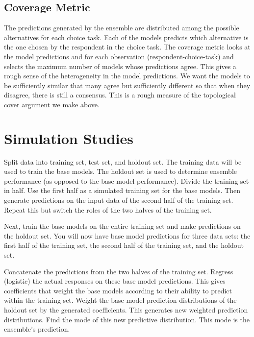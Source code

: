 \documentclass[12pt,titlepage]{mktg-article}
\begin{document}
\hypertarget{coverage-metric}{%
\subsection{Coverage Metric}\label{coverage-metric}}

The predictions generated by the ensemble are distributed among the possible alternatives for each choice task. Each of the models predicts which alternative is the one chosen by the respondent in the choice task. The coverage metric looks at the model predictions and for each observation (respondent-choice-task) and selects the maximum number of models whose predictions agree. This gives a rough sense of the heterogeneity in the model predictions. We want the models to be sufficiently similar that many agree but sufficiently different so that when they disagree, there is still a consensus. This is a rough measure of the topological cover argument we make above.

\hypertarget{simulation-studies}{%
\section{Simulation Studies}\label{simulation-studies}}

Split data into training set, test set, and holdout set. The training data will be used to train the base models. The holdout set is used to determine ensemble performance (as opposed to the base model performance). Divide the training set in half. Use the first half as a simulated training set for the base models. Then generate predictions on the input data of the second half of the training set. Repeat this but switch the roles of the two halves of the training set.

Next, train the base models on the entire training set and make predictions on the holdout set. You will now have base model predictions for three data sets: the first half of the training set, the second half of the training set, and the holdout set.

Concatenate the predictions from the two halves of the training set. Regress (logistic) the actual responses on these base model predictions. This gives coefficients that weight the base models according to their ability to predict within the training set. Weight the base model prediction distributions of the holdout set by the generated coefficients. This generates new weighted prediction distributions. Find the mode of this new predictive distribution. This mode is the ensemble's prediction.
\end{document}
